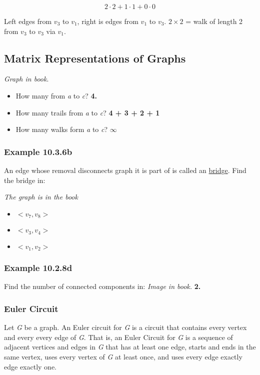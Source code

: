 \documentclass{article}
\begin{document}
\begin{equation}
2 \cdot 2 + 1 \cdot 1 + 0 \cdot 0
\end{equation}

Left edges from $v_3$ to $v_1$, right is edges from $v_1$ to $v_3$. $2 \times 2$ = walk of length 2 from $v_3$ to $v_3$ via $v_1$.

\setcounter{subsection}{1}
\subsection{Matrix Representations of Graphs}
\textit{Graph in book}.
\begin{itemize}
\item How many from \textit{a} to \textit{c}? \textbf{4.}
\item How many trails from \textit{a} to \textit{c}? \textbf{4 + 3 + 2 + 1}
\item How many walks form \textit{a} to \textit{c}? $\infty$
\end{itemize}

\subsubsection{Example 10.3.6b}
An edge whose removal disconnects graph it is part of is called an \underline{bridge}. Find the bridge in:

\textit{The graph is in the book}

\begin{itemize}
\item $<v_7, v_8>$
\item $<v_3, v_4>$
\item $<v_1, v_2>$
\end{itemize}

\subsubsection{Example 10.2.8d}
Find the number of connected components in: \textit{Image in book.} \textbf{2.}

\subsubsection{Euler Circuit}
Let \textit{G} be a graph. An Euler circuit for \textit{G} is a circuit that contains every vertex and every every edge of \textit{G}. That is, an Euler Circuit for \textit{G} is a sequence of adjacent vertices and edges in \textit{G} that has at least one edge, starts and ends in the same vertex, uses every vertex of \textit{G} at least once, and uses every edge exactly edge exactly one.
\end{document}
